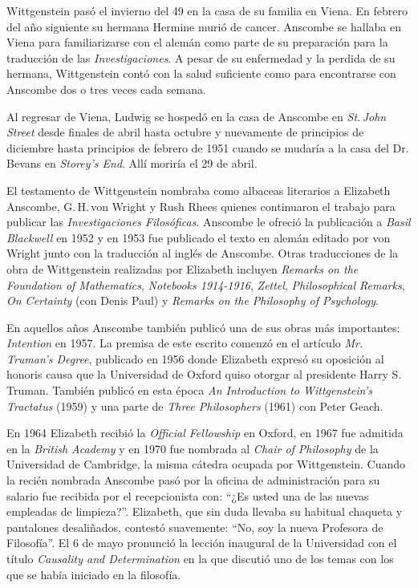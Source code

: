Wittgenstein pasó el invierno del 49 en la casa de su familia en Viena. En febrero del año siguiente su hermana Hermine murió de cancer. Anscombe se hallaba en Viena para familiarizarse con el alemán como parte de su preparación para la traducción de las \emph{Investigaciones}. A pesar de su enfermedad y la perdida de su hermana, Wittgenstein contó con la salud suficiente como para encontrarse con Anscombe dos o tres veces cada semana.\autocite[Cf.~][562]{monk1991duty}

Al regresar de Viena, Ludwig se hospedó en la casa de Anscombe en \emph{St.\,John Street} desde finales de abril hasta octubre y nuevamente de principios de diciembre hasta principios de febrero de 1951 cuando se mudaría a la casa del Dr.\,Bevans en \emph{Storey's End}.\autocite[Cf.~][567]{monk1991duty} Allí moriría el 29 de abril.

El testamento de Wittgenstein nombraba como albaceas literarios a Elizabeth Anscombe, G.\,H.\,von Wright y Rush Rhees quienes continuaron el trabajo para publicar las \emph{Investigaciones Filosóficas}. Anscombe le ofreció la publicación a \emph{Basil Blackwell} en 1952 y en 1953 fue publicado el texto en alemán editado por von Wright junto con la traducción al inglés de Anscombe. Otras traducciones de la obra de Wittgenstein realizadas por Elizabeth incluyen \emph{Remarks on the Foundation of Mathematics}, \emph{Notebooks 1914-1916}, \emph{Zettel}, \emph{Philosophical Remarks}, \emph{On Certainty} (con Denis Paul) y \emph{Remarks on the Philosophy of Psychology}.\autocite[Cf.~][38]{teichman2002fellows}

En aquellos años Anscombe también publicó una de sus obras más importantes: \emph{Intention} en 1957. La premisa de este escrito comenzó en el artículo \emph{Mr. Truman's Degree}, publicado en 1956 donde Elizabeth expresó su oposición al honoris causa que la Universidad de Oxford quiso otorgar al presidente Harry S. Truman.\autocite[Cf.~][101]{grimi2014dl} También publicó en esta época \emph{An Introduction to Wittgenstein's Tractatus} (1959) y una parte de \emph{Three Philosophers} (1961) con Peter Geach.\autocite[Cf.~][39]{teichman2002fellows}

En 1964 Elizabeth recibió la \emph{Official Fellowship} en Oxford, en 1967 fue admitida en la \emph{British Academy} y en 1970 fue nombrada al \emph{Chair of Philosophy} de la Universidad de Cambridge, la misma cátedra ocupada por Wittgenstein. Cuando la recién nombrada Anscombe pasó por la oficina de administración para su salario fue recibida por el recepcionista con: \enquote{¿Es usted una de las nuevas empleadas de limpieza?}. Elizabeth, que sin duda llevaba su habitual chaqueta y pantalones desaliñados, contestó suavemente: \enquote{No, soy la nueva Profesora de Filosofía}.\autocite[Cf.~][37]{teichman2002fellows} El 6 de mayo pronunció la lección inaugural de la Universidad con el título \emph{Causality and Determination} en la que discutió uno de los temas con los que se había iniciado en la filosofía.

